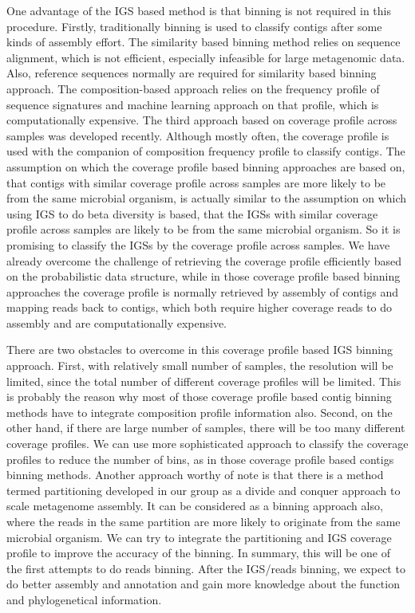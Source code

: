 One advantage of the IGS based method is that binning is not required in this
procedure. Firstly, traditionally binning is used to classify contigs after some
kinds of assembly effort. The similarity based binning method relies on
sequence alignment, which is not efficient, especially infeasible for large
metagenomic data. Also, reference sequences normally are required for
similarity based binning approach. The composition-based approach relies on the
frequency profile of sequence signatures and machine learning approach on that
profile, which is computationally expensive. 
The third approach based on coverage profile across samples was developed
recently.\cite{Imelfort2014}\cite{Alneberg2014} Although mostly often, the coverage
profile is used with the companion of composition frequency profile to classify
contigs. The assumption on which the coverage profile based binning approaches
are based on, that contigs with similar coverage profile across samples are
more likely to be from the same microbial organism, is actually similar to the
assumption on which using IGS to do beta diversity is based, that the IGSs with
similar coverage profile across samples are likely to be from the same
microbial organism. So it is promising to classify the IGSs by the coverage
profile across samples. We have already overcome the challenge of retrieving the
coverage profile efficiently based on the probabilistic data structure, while
in those coverage profile based binning approaches the coverage profile is 
normally retrieved by assembly of contigs and mapping
reads back to contigs, which both require higher coverage reads to do assembly
and are computationally expensive. 

There are two obstacles to overcome in this coverage profile based
IGS binning approach. First, with relatively small number of samples, the
resolution will be limited, since the total number of different coverage
profiles will be limited. This is probably the reason why most of those coverage
profile based contig binning methods have to integrate composition profile information
also. Second, on the other hand, if there are large number of samples, there
will be too many different coverage profiles. We can use more sophisticated
 approach to classify the coverage profiles to reduce the number of bins,
as in those coverage profile based contigs binning methods. Another approach
worthy of note is that there is a method termed partitioning developed in
our group as a divide and conquer approach to scale metagenome assembly. It can be 
considered as a binning approach also, where the reads in the same
partition are more likely to originate from the same microbial organism. We can
try to integrate the partitioning and IGS coverage profile to improve the
accuracy of the binning. In summary, this will be one of the first attempts to
do reads binning. After the IGS/reads binning,  we expect to do better assembly
 and annotation and gain more knowledge about the
function and phylogenetical information.  

